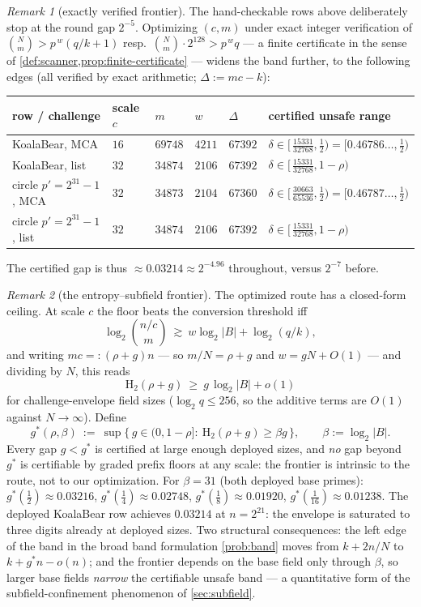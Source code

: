 \documentclass[11pt]{article}
\theoremstyle{definition}
\theoremstyle{remark}
\newtheorem{remark}[remark]{Remark}
\newcommand{\B}{B}
\newcommand{\Hb}{\mathrm{H}_2}
\begin{document}
\begin{remark}[exactly verified frontier]\label{rem:exact-frontier}
The hand-checkable rows above deliberately stop at the round gap $2^{-5}$. Optimizing $(c,m)$ under exact integer verification of $\binom{N}{m}>p^{\,w}(q/k+1)$ resp.\ $\binom Nm\cdot2^{128}>p^{\,w}q$ --- a finite certificate in the sense of \cref{def:scanner,prop:finite-certificate} --- widens the band further, to the following edges (all verified by exact arithmetic; $\Delta:=mc-k$):
\begin{center}\footnotesize
\begin{tabular}{@{}llllll@{}}
\toprule
row / challenge & scale $c$ & $m$ & $w$ & $\Delta$ & certified unsafe range \\
\midrule
KoalaBear, MCA & $16$ & $69748$ & $4211$ & $67392$ & $\delta\in[\,\tfrac{15331}{32768},\tfrac12)=[0.46786\ldots,\tfrac12)$ \\
KoalaBear, list & $32$ & $34874$ & $2106$ & $67392$ & $\delta\in[\,\tfrac{15331}{32768},1-\rho)$ \\
circle $p'{=}2^{31}{-}1$, MCA & $32$ & $34873$ & $2104$ & $67360$ & $\delta\in[\,\tfrac{30663}{65536},\tfrac12)=[0.46787\ldots,\tfrac12)$ \\
circle $p'{=}2^{31}{-}1$, list & $32$ & $34874$ & $2106$ & $67392$ & $\delta\in[\,\tfrac{15331}{32768},1-\rho)$ \\
\bottomrule
\end{tabular}
\end{center}
The certified gap is thus $\approx0.03214\approx2^{-4.96}$ throughout, versus $2^{-7}$ before.
\end{remark}

\begin{remark}[the entropy--subfield frontier]\label{rem:entropy-frontier}
The optimized route has a closed-form ceiling. At scale $c$ the floor beats the conversion threshold iff
\[
\log_2\binom{n/c}{m}\ \gtrsim\ w\log_2|\B|+\log_2(q/k),
\]
and writing $mc=:(\rho+g)n$ --- so $m/N=\rho+g$ and $w=gN+O(1)$ --- and dividing by $N$, this reads
\[
\Hb(\rho+g)\ \ge\ g\,\log_2|\B|+o(1)
\]
for challenge-envelope field sizes ($\log_2q\le256$, so the additive terms are $O(1)$ against $N\to\infty$). Define
\[
g^*(\rho,\beta)\ :=\ \sup\bigl\{\,g\in(0,1-\rho]:\ \Hb(\rho+g)\ge\beta g\,\bigr\},
\qquad
\beta:=\log_2|\B| .
\]
Every gap $g<g^*$ is certified at large enough deployed sizes, and \emph{no} gap beyond $g^*$ is certifiable by graded prefix floors at any scale: the frontier is intrinsic to the route, not to our optimization. For $\beta=31$ (both deployed base primes): $g^*(\tfrac12)\approx0.03216$, $g^*(\tfrac14)\approx0.02748$, $g^*(\tfrac18)\approx0.01920$, $g^*(\tfrac1{16})\approx0.01238$. The deployed KoalaBear row achieves $0.03214$ at $n=2^{21}$: the envelope is saturated to three digits already at deployed sizes. Two structural consequences: the left edge of the band in the broad band formulation \cref{prob:band} moves from $k+2n/N$ to $k+g^*n-o(n)$; and the frontier depends on the base field only through $\beta$, so larger base fields \emph{narrow} the certifiable unsafe band --- a quantitative form of the subfield-confinement phenomenon of \cref{sec:subfield}.
\end{remark}
\end{document}
